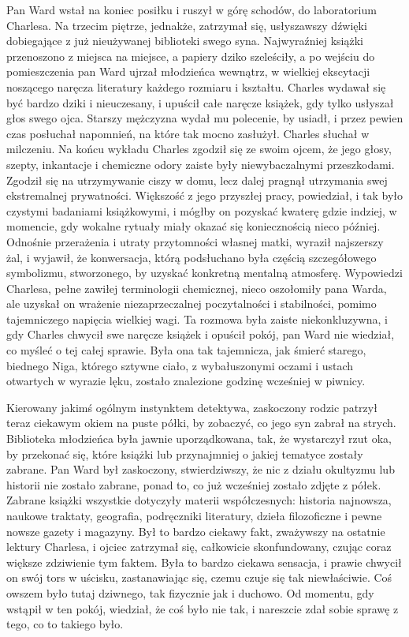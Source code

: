 Pan Ward wstał na koniec posiłku i ruszył w górę schodów, do laboratorium Charlesa. Na trzecim piętrze, jednakże, zatrzymał się, usłyszawszy dźwięki dobiegające z już nieużywanej biblioteki swego syna. Najwyraźniej książki przenoszono z miejsca na miejsce, a papiery dziko szeleściły, a po wejściu do pomieszczenia pan Ward ujrzał młodzieńca wewnątrz, w wielkiej ekscytacji noszącego naręcza literatury każdego rozmiaru i kształtu.  Charles wydawał się być bardzo dziki i nieuczesany, i upuścił całe naręcze książek, gdy tylko usłyszał głos swego ojca. Starszy mężczyzna wydał mu polecenie, by usiadł, i przez pewien czas posłuchał napomnień, na które tak mocno zasłużył. Charles słuchał w milczeniu. Na końcu wykładu Charles zgodził się ze swoim ojcem, że jego głosy, szepty, inkantacje i chemiczne odory zaiste były niewybaczalnymi przeszkodami. Zgodził się na utrzymywanie ciszy w domu, lecz dalej pragnął utrzymania swej ekstremalnej prywatności. Większość z jego przyszłej pracy, powiedział, i tak było czystymi badaniami książkowymi, i mógłby on pozyskać kwaterę gdzie indziej, w momencie, gdy wokalne rytuały miały okazać się koniecznością nieco później. Odnośnie przerażenia i utraty przytomności własnej matki, wyraził najszerszy żal, i wyjawił, że konwersacja, którą podsłuchano była częścią szczegółowego symbolizmu, stworzonego, by uzyskać konkretną mentalną atmosferę. Wypowiedzi Charlesa, pełne zawiłej terminologii chemicznej, nieco oszołomiły pana Warda, ale uzyskał on wrażenie niezaprzeczalnej poczytalności i stabilności, pomimo tajemniczego napięcia wielkiej wagi. Ta rozmowa była zaiste niekonkluzywna, i gdy Charles chwycił swe naręcze książek i opuścił pokój, pan Ward nie wiedział, co myśleć o tej całej sprawie. Była ona tak tajemnicza, jak śmierć starego, biednego Niga, którego sztywne ciało, z wybałuszonymi oczami i ustach otwartych w wyrazie lęku, zostało znalezione godzinę wcześniej w piwnicy. 

Kierowany jakimś ogólnym instynktem detektywa, zaskoczony rodzic patrzył teraz ciekawym okiem na puste półki, by zobaczyć, co jego syn zabrał na strych. Biblioteka młodzieńca była jawnie uporządkowana, tak, że wystarczył rzut oka, by przekonać się, które książki lub przynajmniej o jakiej tematyce zostały zabrane. Pan Ward był zaskoczony, stwierdziwszy, że nic z działu okultyzmu lub historii nie zostało zabrane, ponad to, co już wcześniej zostało zdjęte z półek. Zabrane książki wszystkie dotyczyły materii współczesnych: historia najnowsza, naukowe traktaty, geografia, podręczniki literatury, dzieła filozoficzne i pewne nowsze gazety i magazyny. Był to bardzo ciekawy fakt, zważywszy na ostatnie lektury Charlesa, i ojciec zatrzymał się, całkowicie skonfundowany, czując coraz większe zdziwienie tym faktem. Była to bardzo ciekawa sensacja, i prawie chwycił on swój tors w uścisku, zastanawiając się, czemu czuje się tak niewłaściwie. Coś owszem było tutaj dziwnego, tak fizycznie jak i duchowo. Od momentu, gdy wstąpił w ten pokój, wiedział, że coś było nie tak, i nareszcie zdał sobie sprawę z tego, co to takiego było. 

